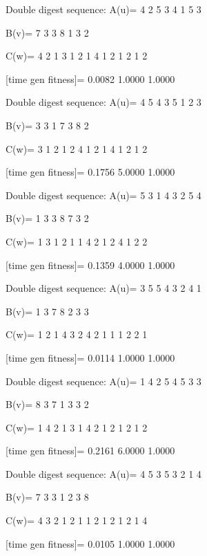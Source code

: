 Double digest sequence:
A(u)=
     4     2     5     3     4     1     5     3

B(v)=
     7     3     3     8     1     3     2

C(w)=
     4     2     1     3     1     2     1     4     1     2     1     2     1     2

[time gen fitness]=
    0.0082    1.0000    1.0000

Double digest sequence:
A(u)=
     4     5     4     3     5     1     2     3

B(v)=
     3     3     1     7     3     8     2

C(w)=
     3     1     2     1     2     4     1     2     1     4     1     2     1     2

[time gen fitness]=
    0.1756    5.0000    1.0000

Double digest sequence:
A(u)=
     5     3     1     4     3     2     5     4

B(v)=
     1     3     3     8     7     3     2

C(w)=
     1     3     1     2     1     1     4     2     1     2     4     1     2     2

[time gen fitness]=
    0.1359    4.0000    1.0000

Double digest sequence:
A(u)=
     3     5     5     4     3     2     4     1

B(v)=
     1     3     7     8     2     3     3

C(w)=
     1     2     1     4     3     2     4     2     1     1     1     2     2     1

[time gen fitness]=
    0.0114    1.0000    1.0000

Double digest sequence:
A(u)=
     1     4     2     5     4     5     3     3

B(v)=
     8     3     7     1     3     3     2

C(w)=
     1     4     2     1     3     1     4     2     1     2     1     2     1     2

[time gen fitness]=
    0.2161    6.0000    1.0000

Double digest sequence:
A(u)=
     4     5     3     5     3     2     1     4

B(v)=
     7     3     3     1     2     3     8

C(w)=
     4     3     2     1     2     1     1     2     1     2     1     2     1     4

[time gen fitness]=
    0.0105    1.0000    1.0000


